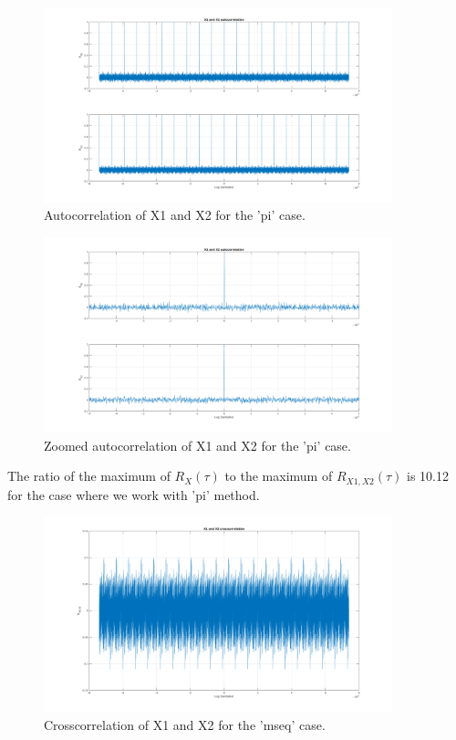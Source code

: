 \begin{figure}[H]
	\centering
	\includegraphics[width=0.9\textwidth]{figs/ex8_autocorr_pi.png}
	\caption{Autocorrelation of X1 and X2 for the 'pi' case.}
	\label{fig:ex8_autocorr_pi}
\end{figure}

\begin{figure}[H]
	\centering
	\includegraphics[width=0.9\textwidth]{figs/ex8_autocorr_zoomed_pi.png}
	\caption{Zoomed autocorrelation of X1 and X2 for the 'pi' case.}
	\label{fig:ex8_autocorr_zoomed_pi}
\end{figure}

The ratio of the maximum of $R_X(\tau)$ to the maximum of $R_{X1,X2}(\tau)$ is
10.12 for the case where we work with 'pi' method.

\begin{figure}[H]
	\centering
	\includegraphics[width=0.9\textwidth]{figs/ex8_crosscorr_mseq.png}
	\caption{Crosscorrelation of X1 and X2 for the 'mseq' case.}
	\label{fig:ex8_crosscorr_mseq}
\end{figure}

